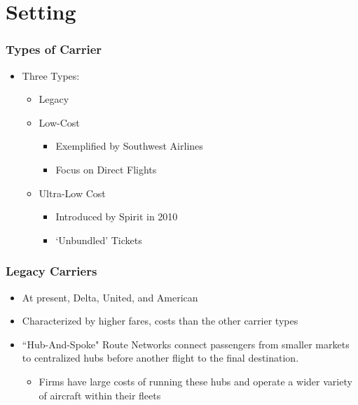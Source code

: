 \documentclass[xcolor=dvipsnames]{beamer}
\begin{document}
    \section{Setting}
	\begin{frame}
		\frametitle{Types of Carrier}
		\begin{itemize}
			\item Three Types:
			\begin{itemize}
				\item Legacy %
				\item Low-Cost 
				\begin{itemize}
					\item Exemplified by Southwest Airlines
					\item Focus on Direct Flights
				\end{itemize}
				\item Ultra-Low Cost
				\begin{itemize}
					\item Introduced by Spirit in 2010
					\item `Unbundled' Tickets
				\end{itemize}
			\end{itemize}
		\end{itemize}
	\end{frame}
	
	\begin{frame}
		\frametitle{Legacy Carriers}
		\begin{itemize}
			\item At present, Delta, United, and American
			\item Characterized by higher fares, costs than the other carrier types
			\item ``Hub-And-Spoke" Route Networks connect passengers from smaller markets to centralized hubs before another flight to the final destination.
			\begin{itemize}
				\item Firms have large costs of running these hubs and operate a wider variety of aircraft within their fleets
			\end{itemize}
		\end{itemize}
	\end{frame}
	
\end{document}
